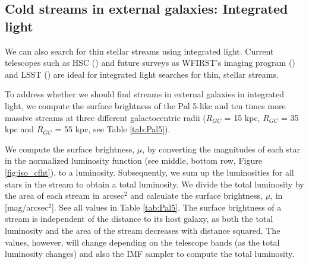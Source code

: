 \documentclass[twocolumn]{aastex62}
\newcommand{\todo}[1]{{\color{red} TODO: #1}}
\begin{document}






\subsection{Cold streams in external galaxies: Integrated light}
\label{sec:integrated}
We can also search for thin stellar streams using integrated light. Current telescopes such as HSC (\citealt{miyazaki12}) and future surveys as WFIRST's imaging program (\citealt{spergel13}) and LSST  (\citealt{ivezi08}) are ideal for integrated light searches for thin, stellar streams. 

To address whether we should find streams in external galaxies in integrated light, we compute the surface brightness of the Pal 5-like and ten times more massive streams at three different galactocentric radii ($R_{GC}$ = 15  kpc, $R_{GC}$ = 35 kpc and $R_{GC}$ = 55 kpc, see Table \ref{tab:Pal5}). 

We compute the surface brightness, $\mu$, by converting the magnitudes of each star in the normalized luminosity function (see middle, bottom row, Figure \ref{fig:iso_cfht}), to a luminosity. Subsequently, we sum up the luminosities for all stars in the stream to obtain a total luminosity. We divide the total luminosity by the area of each stream in arcsec$^2$ and calculate the surface brightness, $\mu$, in [mag/arcsec$^2$]. See all values in Table \ref{tab:Pal5}. The surface brightness of a stream is independent of the distance to its host galaxy, as both the total luminosity and the area of the stream decreases with distance squared. The values, however, will change depending on the telescope bands (as the total luminosity changes) and also the IMF sampler to compute the total luminosity. 
\end{document}
